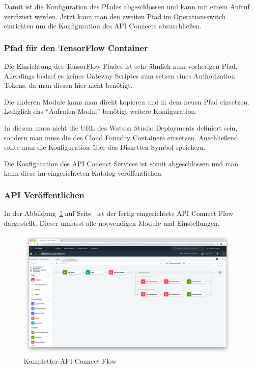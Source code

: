 Damit ist die Konfiguration des Pfades abgeschlossen und kann mit einem Aufruf verifiziert werden. Jetzt kann man den
zweiten Pfad im Operationsswitch einrichten um die Konfiguration des API Connects abzuschließen.

\subsubsection*{Pfad für den TensorFlow Container}
Die Einrichtung des TensorFlow-Pfades ist sehr ähnlich zum vorherigen Pfad. Allerdings bedarf es keines Gateway Scriptes
zum setzen eines Authorization Tokens, da man diesen hier nicht benötigt.

Die anderen Module kann man direkt kopieren und in dem neuen Pfad einsetzen. Lediglich das \enquote{Aufrufen-Modul}
benötigt weitere Konfiguration.

In diesem muss nicht die URL des Watson Studio Deployments definiert sein, sondern man muss die des Cloud
Foundry Containers einsetzen. Anschließend sollte man die Konfiguration über das Disketten-Symbol speichern.

Die Konfiguration des API Conenct Services ist somit abgeschlossen und man kann diese im eingerichteten Katalog
veröffentlichen.

\subsubsection{API Veröffentlichen}
In der Abbildung~\ref{fig:umsetzung_api_connect} auf Seite~\pageref{fig:umsetzung_api_connect} ist der fertig
eingerichtete API Connect Flow dargestellt. Dieser umfasst alle notwendigen Module und Einstellungen.

\begin{figure}[h]
    \centering
    \includegraphics[width=\textwidth]{images/kapitel_3/api_connect.png}
    \caption{Kompletter API Connect Flow}
    \label{fig:umsetzung_api_connect}
\end{figure}

